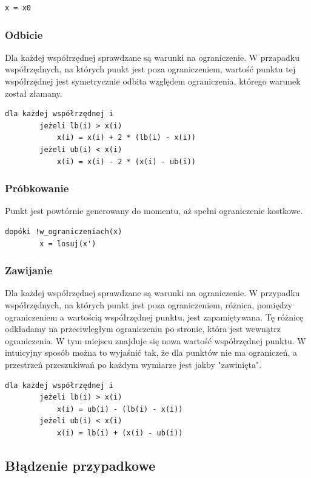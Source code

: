 \documentclass{mini}
\begin{document}
\begin{Verbatim}[baselinestretch=1.1]
	x = x0
\end{Verbatim}


\subsubsection{Odbicie}
Dla każdej współrzędnej sprawdzane są warunki na ograniczenie. W przapadku współrzędnych, na których punkt jest poza ograniczeniem, wartość punktu tej współrzędnej jest symetrycznie odbita względem ograniczenia, którego warunek został złamany.

\begin{Verbatim}[baselinestretch=1.1]
	dla każdej współrzędnej i
		jeżeli lb(i) > x(i)
			x(i) = x(i) + 2 * (lb(i) - x(i))
		jeżeli ub(i) < x(i)
			x(i) = x(i) - 2 * (x(i) - ub(i))
\end{Verbatim}

\subsubsection{Próbkowanie}
Punkt jest powtórnie generowany do momentu, aż spełni ograniczenie kostkowe.

\begin{Verbatim}[baselinestretch=1.1]
	dopóki !w_ograniczeniach(x)
		x = losuj(x')
\end{Verbatim}

\subsubsection{Zawijanie}
Dla każdej współrzędnej sprawdzane są warunki na ograniczenie. W przypadku współrzędnych, na których punkt jest poza ograniczeniem, różnica, pomiędzy ograniczeniem a wartością współrzędnej punktu, jest zapamiętywana. Tę różnicę odkładamy na przeciwległym ograniczeniu po stronie, która jest wewnątrz ograniczenia. W tym miejscu znajduje się nowa wartość współrzędnej punktu. W intuicyjny sposób można to wyjaśnić tak, że dla punktów nie ma ograniczeń, a przestrzeń przeszukiwań po każdym wymiarze jest jakby "zawinięta".

\begin{Verbatim}[baselinestretch=1.1]
	dla każdej współrzędnej i
		jeżeli lb(i) > x(i)
			x(i) = ub(i) - (lb(i) - x(i))
		jeżeli ub(i) < x(i)
			x(i) = lb(i) + (x(i) - ub(i))
\end{Verbatim}

\subsection{Błądzenie przypadkowe} \label{bladzenie}
\end{document}
